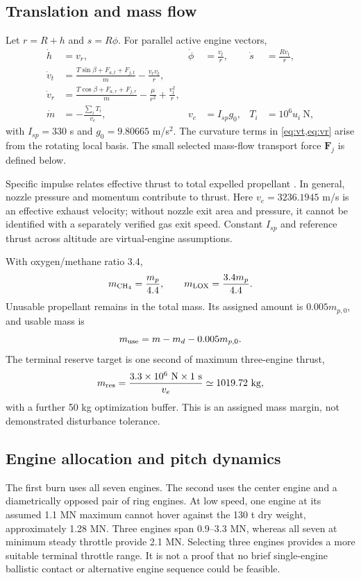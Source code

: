 \documentclass[11pt,a4paper]{article}
\newcommand{\vect}[1]{\bm{#1}}
\newcommand{\kg}{\mathrm{kg}}
\begin{document}
\subsection{Translation and mass flow}
Let $r=R+h$ and $s=R\phi$. For parallel active engine vectors,
\begin{align}
 \dot h&=v_r,&\dot\phi&=\frac{v_t}{r},&\dot s&=\frac{Rv_t}{r},\\
 \dot v_t&=\frac{T\sin\beta+F_{a,t}+F_{j,t}}{m}-\frac{v_rv_t}{r},
 \label{eq:vt}\\
 \dot v_r&=\frac{T\cos\beta+F_{a,r}+F_{j,r}}{m}-\frac{\mu}{r^2}+\frac{v_t^2}{r},
 \label{eq:vr}\\
 \dot m&=-\frac{\sum_i T_i}{v_e},&
 v_e&=I_{sp}g_0,&T_i&=10^6u_i\ \mathrm{N},
\label{eq:mass}
\end{align}
with $I_{sp}=330$ s and $g_0=9.80665$ m/s$^2$. The curvature terms in \cref{eq:vt,eq:vr} arise from the rotating local basis. The small selected mass-flow transport force $\vect F_j$ is defined below.

Specific impulse relates effective thrust to total expelled propellant \cite{isp}. In general, nozzle pressure and momentum contribute to thrust. Here $v_e=3236.1945$ m/s is an effective exhaust velocity; without nozzle exit area and pressure, it cannot be identified with a separately verified gas exit speed. Constant $I_{sp}$ and reference thrust across altitude are virtual-engine assumptions.

With oxygen/methane ratio 3.4,
\begin{equation}
 m_{\rm CH_4}=\frac{m_p}{4.4},\qquad
 m_{\rm LOX}=\frac{3.4m_p}{4.4}.
\end{equation}
Unusable propellant remains in the total mass. Its assigned amount is $0.005m_{p,0}$, and usable mass is
\begin{equation}
 m_{\rm use}=m-m_d-0.005m_{p,0}.
\label{eq:usable}
\end{equation}
The terminal reserve target is one second of maximum three-engine thrust,
\begin{equation}
 m_{\rm res}=\frac{3.3\times10^6\ \mathrm{N}\times1\ \mathrm{s}}{v_e}
 \simeq1019.72\ \kg,
\label{eq:reserve}
\end{equation}
with a further 50 kg optimization buffer. This is an assigned mass margin, not demonstrated disturbance tolerance.

\subsection{Engine allocation and pitch dynamics}
The first burn uses all seven engines. The second uses the center engine and a diametrically opposed pair of ring engines. At low speed, one engine at its assumed 1.1 MN maximum cannot hover against the 130 t dry weight, approximately 1.28 MN. Three engines span 0.9--3.3 MN, whereas all seven at minimum steady throttle provide 2.1 MN. Selecting three engines provides a more suitable terminal throttle range. It is not a proof that no brief single-engine ballistic contact or alternative engine sequence could be feasible.
\end{document}
